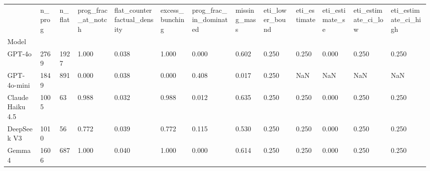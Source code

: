\begin{tabular}{lllllllllllll}
\toprule
 & n_prog & n_flat & prog_frac_at_notch & flat_counterfactual_density & excess_bunching & prog_frac_in_dominated & missing_mass & eti_lower_bound & eti_estimate & eti_estimate_se & eti_estimate_ci_low & eti_estimate_ci_high \\
Model &  &  &  &  &  &  &  &  &  &  &  &  \\
\midrule
GPT-4o & 2769 & 1927 & 1.000 & 0.038 & 1.000 & 0.000 & 0.602 & 0.250 & 0.250 & 0.000 & 0.250 & 0.250 \\
GPT-4o-mini & 1849 & 891 & 0.000 & 0.038 & 0.000 & 0.408 & 0.017 & 0.250 & NaN & NaN & NaN & NaN \\
Claude Haiku 4.5 & 1005 & 63 & 0.988 & 0.032 & 0.988 & 0.012 & 0.635 & 0.250 & 0.250 & 0.000 & 0.250 & 0.250 \\
DeepSeek V3 & 1010 & 56 & 0.772 & 0.039 & 0.772 & 0.115 & 0.530 & 0.250 & 0.250 & 0.000 & 0.250 & 0.250 \\
Gemma 4 & 1606 & 687 & 1.000 & 0.040 & 1.000 & 0.000 & 0.614 & 0.250 & 0.250 & 0.000 & 0.250 & 0.250 \\
\bottomrule
\end{tabular}
